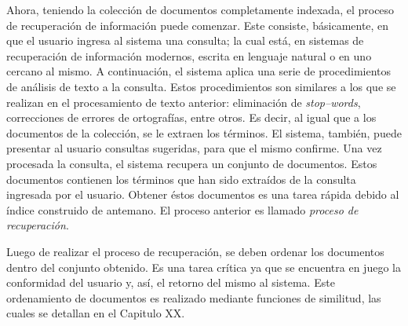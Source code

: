 		Ahora, teniendo la colección de documentos completamente indexada, el proceso de recuperación de información puede comenzar. Este consiste, básicamente, en que el usuario ingresa al sistema una consulta; la cual está, en sistemas de recuperación de información modernos, escrita en lenguaje natural o en uno cercano al mismo. A continuación, el sistema aplica una serie de procedimientos de análisis de texto a la consulta. Estos procedimientos son similares a los que se realizan en el procesamiento de texto anterior: eliminación de \textit{stop--words}, correcciones de errores de ortografías, entre otros. Es decir, al igual que a los documentos de la colección, se le extraen los términos. El sistema, también, puede presentar al usuario consultas sugeridas, para que el mismo confirme. Una vez procesada la consulta, el sistema recupera un conjunto de documentos. Estos documentos contienen los términos que han sido extraídos de la consulta ingresada por el usuario. Obtener éstos documentos es una tarea rápida debido al índice construido de antemano. El proceso anterior es llamado \textit{proceso de recuperación}. \par

		Luego de realizar el proceso de recuperación, se deben ordenar los documentos dentro del conjunto obtenido. Es una tarea crítica ya que se encuentra en juego la conformidad del usuario y, así, el retorno del mismo al sistema. Este ordenamiento de documentos es realizado mediante funciones de similitud, las cuales se detallan en el Capitulo XX.